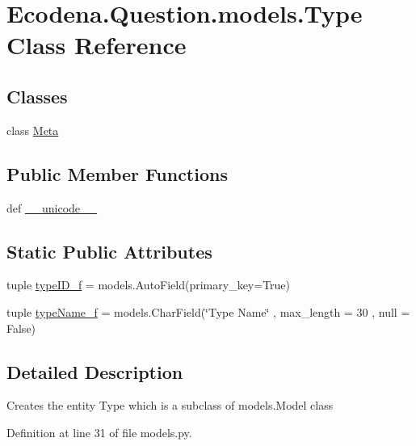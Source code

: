 \hypertarget{class_ecodena_1_1_question_1_1models_1_1_type}{
\section{Ecodena.Question.models.Type Class Reference}
\label{d4/d6c/class_ecodena_1_1_question_1_1models_1_1_type}
}
\subsection*{Classes}
\begin{DoxyCompactItemize}
\item 
class \hyperlink{class_ecodena_1_1_question_1_1models_1_1_type_1_1_meta}{Meta}
\end{DoxyCompactItemize}
\subsection*{Public Member Functions}
\begin{DoxyCompactItemize}
\item 
def \hyperlink{class_ecodena_1_1_question_1_1models_1_1_type_a93856158301bf1adb087684943ef9483}{\_\-\_\-unicode\_\-\_\-}
\end{DoxyCompactItemize}
\subsection*{Static Public Attributes}
\begin{DoxyCompactItemize}
\item 
tuple \hyperlink{class_ecodena_1_1_question_1_1models_1_1_type_a40ce13fbc80fa5236e6a44ffa05ce2f3}{typeID\_\-f} = models.AutoField(primary\_\-key=True)
\item 
tuple \hyperlink{class_ecodena_1_1_question_1_1models_1_1_type_a59414f1e8b717e74171c97e897f08800}{typeName\_\-f} = models.CharField(\char`\"{}Type Name\char`\"{} , max\_\-length = 30 , null = False)
\end{DoxyCompactItemize}


\subsection{Detailed Description}
\begin{DoxyVerb}Creates the entity Type which is a subclass of models.Model class\end{DoxyVerb}
 

Definition at line 31 of file models.py.



